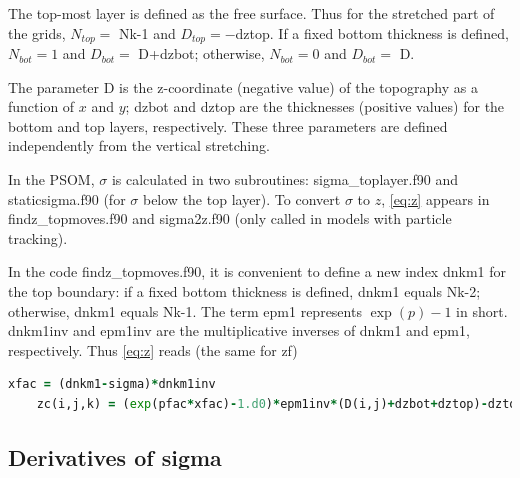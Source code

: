 \documentclass[12pt,letterpaper,titlepage]{article}
\newcommand{\Blue}[1]{{\color{blue}#1}}
\begin{document}
The top-most layer is defined as the free surface. Thus for the stretched part of the grids, $N_{top}=$ Nk-1 and $D_{top}=-$dztop. If a fixed bottom thickness is defined, $N_{bot}=1$ and $D_{bot}=$ D+dzbot; otherwise, $N_{bot}=0$ and $D_{bot}=$ D.\par

The parameter \Blue{D} is the z-coordinate (negative value) of the topography as a function of $x$ and $y$; \Blue{dzbot} and \Blue{dztop} are the thicknesses (positive values) for the bottom and top layers, respectively. These three parameters are defined independently from the vertical stretching.\par%

In the PSOM, $\sigma$ is calculated in two subroutines: \Blue{sigma\_toplayer.f90} and \Blue{staticsigma.f90} (for $\sigma$ below the top layer). To convert $\sigma$ to $z$, \eqref{eq:z} appears in \Blue{findz\_topmoves.f90} and \Blue{sigma2z.f90} (only called in models with particle tracking).\par

In the code findz\_topmoves.f90, it is convenient to define a new index \Blue{dnkm1} for the top boundary: if a fixed bottom thickness is defined, dnkm1 equals Nk-2; otherwise, dnkm1 equals Nk-1. The term \Blue{epm1} represents $\exp(p)-1$ in short. \Blue{dnkm1inv} and \Blue{epm1inv} are the multiplicative inverses of dnkm1 and epm1, respectively. Thus \eqref{eq:z} reads (the same for zf)
\begin{lstlisting}[language=Fortran, caption=findz\_topmoves.f90]
    xfac = (dnkm1-sigma)*dnkm1inv
    zc(i,j,k) = (exp(pfac*xfac)-1.d0)*epm1inv*(D(i,j)+dzbot+dztop)-dztop
\end{lstlisting}

\subsection{Derivatives of sigma}
\end{document}
